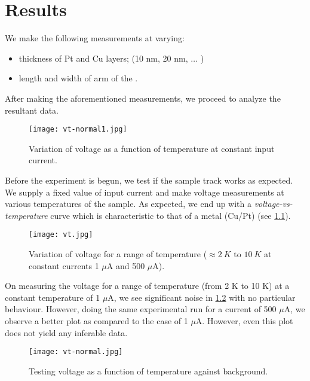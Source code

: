\chapter{Results}

We make the following measurements at varying:

\begin{itemize}
    \item thickness of Pt and Cu layers; (10 nm, 20 nm, $\ldots$ )
    \item length and width of arm of the \Hst.
\end{itemize}

\label{chapter5}

After making the aforementioned measurements, we proceed to analyze the resultant data.

\begin{figure}[h]
    \centering
    \texttt{[image: vt-normal1.jpg]}
    \caption{Variation of voltage as a function of temperature at constant input current.}
    \label{fig:ohm}
\end{figure}

Before the experiment is begun, we test if the sample track works as expected.
We supply a fixed value of input current and make voltage measurements at various temperatures of the sample.
As expected, we end up with a \textit{voltage-vs-temperature} curve which is characteristic to that of a metal (Cu/Pt) (see \cref{fig:ohm}).

\begin{figure}[h]
    \centering
    \texttt{[image: vt.jpg]}
    \caption{Variation of voltage for a range of temperature (\( \approx 2 \: K \) to \( 10 \: K \) at constant currents 1 \( \mu \)A and 500 \( \mu \)A).}
    \label{fig:vt}
\end{figure}

On measuring the voltage for a range of temperature (from 2 K to 10 K) at a constant temperature of 1 \( \mu \)A, we see significant noise in \cref{fig:vt} with no particular behaviour. However, doing the same experimental run for a current of 500 \( \mu \)A, we observe a better plot as compared to the case of 1 \( \mu \)A. However, even this plot does not yield any inferable data.

\begin{figure}[h]
    \centering
    \texttt{[image: vt-normal.jpg]}
    \caption{Testing voltage as a function of temperature against background.}
    \label{fig:bg}
\end{figure}


